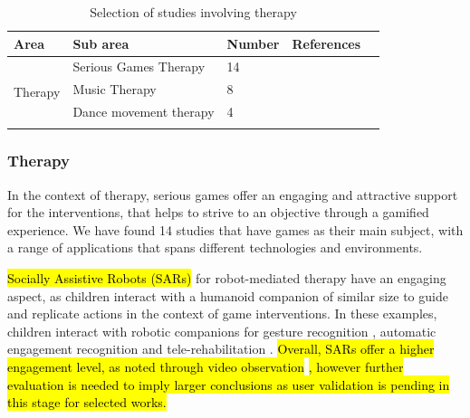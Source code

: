 \documentclass[a4paper,fleqn]{cas-sc}
\begin{document}
\begin{table}[h]
\centering
\begin{tabular*}{6.2in}{p{0.7in}|p{0.85in}|p{0.36in}|p{3.5in}p{0in}}
\hline
Area   & Sub area   & Number & References  &  \\ \hline
\multirow{5}{*}{\centering Therapy}
    & Serious Games Therapy & 14 & \cite{Raygoza-Romero21, DeCarolis21, Simeoli20, Telisheva20,  Rosly20, Martinez-Mones19, Wasserman19, Ruiz-Rodriguez19, Ardalan19, Crowell18, AltizerJr18, Caro18, Sharma18, Castelhano17}
    &  \\\cline{2-4}
    & Music Therapy  & 8 & \cite{Ragone22, Mcgowan21, Ma21, Ragone20, Vargas20, Ragone20OS, Yi-Hsiang18, McGowan17} &  \\
    \cline{2-4} 
    & Dance movement therapy & 4 & \cite{Brown22, Trajkova20, Ringland19, Suzuki17} &  \\
     \cline{1-4}
\end{tabular*}
\caption{Selection of studies involving therapy}
\label{TABLE:area-therapy}
\end{table}

\subsubsection{Therapy}
\label{sec:app-contexts-therapy}
In the context of therapy, serious games offer an engaging and attractive support for the interventions, that helps to strive to an objective through a gamified experience. We have found 14 studies that have games as their main subject, with a range of applications that spans different technologies and environments.

\hl{Socially Assistive Robots (SARs)} for robot-mediated therapy have an engaging aspect, as children interact with a humanoid companion of similar size to guide and replicate actions in the context of game interventions. In these examples, children interact with robotic companions for gesture recognition \cite{DeCarolis21}, automatic engagement recognition \cite{Telisheva20} and tele-rehabilitation \cite{Rosly20}. \hl{Overall, SARs offer a higher engagement level, as noted through video observation} \cite{Telisheva20} \hl{, however further evaluation is needed to imply larger conclusions as user validation  is pending in this stage for selected works.}
\end{document}
